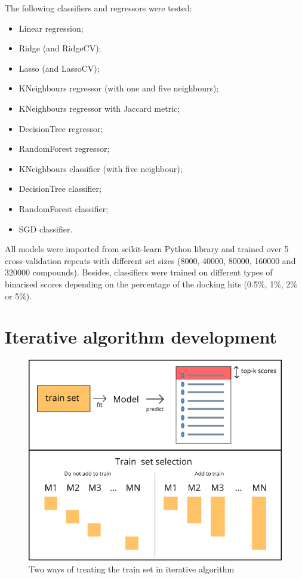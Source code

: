 The following classifiers and regressors were tested:
\begin{itemize}
    \item Linear regression;
    \item Ridge (and RidgeCV);
    \item Lasso (and LassoCV);
    \item KNeighbours regressor (with one and five neighbours);
    \item KNeighbours regressor with Jaccard metric;
    \item DecisionTree regressor;
    \item RandomForest regressor;
    \item KNeighbours classifier (with five neighbour);
    \item DecisionTree classifier;
    \item RandomForest classifier;
    \item SGD classifier.
\end{itemize}

All models were imported from scikit-learn Python library and trained over 5 cross-validation 
repeats with different set sizes (8000, 40000, 80000, 160000 and 320000 compounds).
Besides, classifiers were trained on different types of binarised scores depending 
on the percentage of the docking hits (0.5\%, 1\%, 2\% or 5\%).


\section{Iterative algorithm development}

\begin{figure}
    \centering
    \includegraphics[scale=0.72]{Images/image1.png}
    \caption{Two ways of treating the train set in iterative algorithm}
    \label{TrainSetSelection}
\end{figure}

